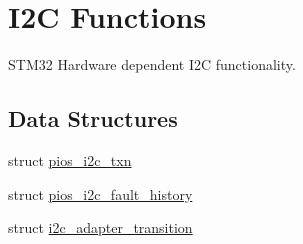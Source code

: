 \hypertarget{group___p_i_o_s___i2_c}{\section{I2\-C Functions}
\label{group___p_i_o_s___i2_c}
}


S\-T\-M32 Hardware dependent I2\-C functionality.  


\subsection*{Data Structures}
\begin{DoxyCompactItemize}
\item 
struct \hyperlink{structpios__i2c__txn}{pios\-\_\-i2c\-\_\-txn}
\item 
struct \hyperlink{structpios__i2c__fault__history}{pios\-\_\-i2c\-\_\-fault\-\_\-history}
\item 
struct \hyperlink{structi2c__adapter__transition}{i2c\-\_\-adapter\-\_\-transition}
\end{DoxyCompactItemize}

